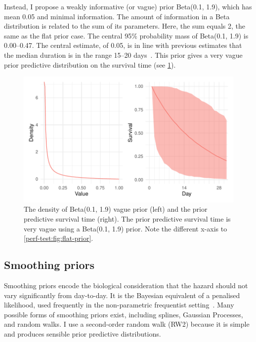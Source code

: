 \documentclass[thesis.tex]{subfiles}
\begin{document}
Instead, I propose a weakly informative (or vague) prior Beta(0.1, 1.9), which has mean 0.05 and minimal information.
The amount of information in a Beta distribution is related to the sum of its parameters.
Here, the sum equals 2, the same as the flat prior case.
The central 95\% probability mass of Beta(0.1, 1.9) is 0.00--0.47.
The central estimate, of 0.05, is in line with previous estimates that the median duration is in the range 15--20 days~\autocite{cevikShedding}.
This prior gives a very vague prior predictive distribution on the survival time (see \cref{perf-test:fig:vague-prior}).
\begin{figure}
  \centering \includegraphics{cis-perfect-testing/vague-prior}
  \caption[Vague prior for the hazard]{The density of Beta(0.1, 1.9) vague prior (left) and the prior predictive survival time (right). The prior predictive survival time is very vague using a Beta(0.1, 1.9) prior. Note the different x-axis to \cref{perf-test:fig:flat-prior}. \label{perf-test:fig:vague-prior}}
\end{figure}


\subsection{Smoothing priors}

Smoothing priors encode the biological consideration that the hazard should not vary significantly from day-to-day.
It is the Bayesian equivalent of a penalised likelihood, used frequently in the non-parametric frequentist setting~\autocite[e.g.][]{bacchettiNonparametric}.
Many possible forms of smoothing priors exist, including splines, Gaussian Processes, and random walks.
I use a second-order random walk (RW2) because it is simple and produces sensible prior predictive distributions.
\end{document}
